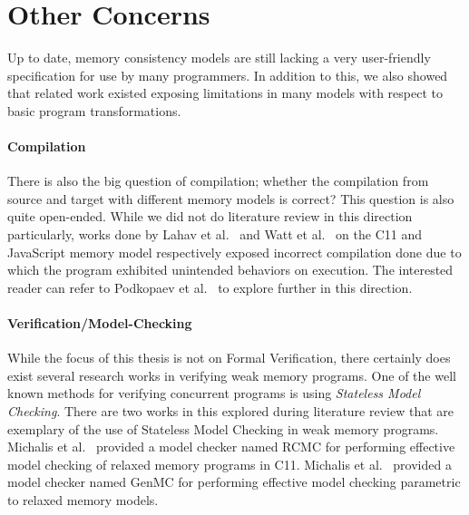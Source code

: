 \section{Other Concerns}

    Up to date, memory consistency models are still lacking a very user-friendly specification for use by many programmers. 
    In addition to this, we also showed that related work existed exposing limitations in many models with respect to basic program transformations.
    
    \paragraph{Compilation}
    There is also the big question of compilation; whether the compilation from source and target with different memory models is correct? This question is also quite open-ended. 
    While we did not do literature review in this direction particularly, works done by Lahav et al.~\cite{Lahav} and Watt et al.~\cite{WattC} on the C11 and JavaScript memory model respectively exposed incorrect compilation done due to which the program exhibited unintended behaviors on execution. 
    The interested reader can refer to Podkopaev et al.~\cite{Anton} to explore further in this direction.
    
    \paragraph{Verification/Model-Checking}
    While the focus of this thesis is not on Formal Verification, there certainly does exist several research works in verifying weak memory programs. 
    One of the well known methods for verifying concurrent programs is using \textit{Stateless Model Checking}. 
    There are two works in this explored during literature review that are exemplary of the use of Stateless Model Checking in weak memory programs.
    Michalis et al.~\cite{Michalis1} provided a model checker named RCMC for performing effective model checking of relaxed memory programs in C11. 
    Michalis et al.~\cite{Michalis2} provided a model checker named GenMC for performing effective model checking parametric to relaxed memory models. 
    

